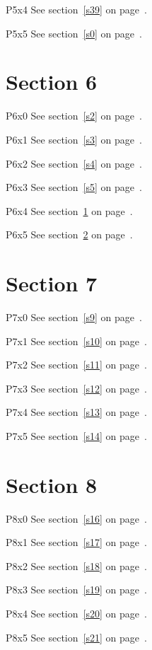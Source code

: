 P5x4 \w\w\w\w\w\w See section~\ref{s39} on page~\pageref{s19}.

P5x5 \w\w\w\w\w\w See section~\ref{s0} on page~\pageref{s20}.

\section{Section 6}\label{s6}
P6x0 \w\w\w\w\w\w See section~\ref{s2} on page~\pageref{s18}.

P6x1 \w\w\w\w\w\w See section~\ref{s3} on page~\pageref{s19}.

P6x2 \w\w\w\w\w\w See section~\ref{s4} on page~\pageref{s20}.

P6x3 \w\w\w\w\w\w See section~\ref{s5} on page~\pageref{s21}.

P6x4 \w\w\w\w\w\w See section~\ref{s6} on page~\pageref{s22}.

P6x5 \w\w\w\w\w\w See section~\ref{s7} on page~\pageref{s23}.

\section{Section 7}\label{s7}
P7x0 \w\w\w\w\w\w See section~\ref{s9} on page~\pageref{s21}.

P7x1 \w\w\w\w\w\w See section~\ref{s10} on page~\pageref{s22}.

P7x2 \w\w\w\w\w\w See section~\ref{s11} on page~\pageref{s23}.

P7x3 \w\w\w\w\w\w See section~\ref{s12} on page~\pageref{s24}.

P7x4 \w\w\w\w\w\w See section~\ref{s13} on page~\pageref{s25}.

P7x5 \w\w\w\w\w\w See section~\ref{s14} on page~\pageref{s26}.

\section{Section 8}\label{s8}
P8x0 \w\w\w\w\w\w See section~\ref{s16} on page~\pageref{s24}.

P8x1 \w\w\w\w\w\w See section~\ref{s17} on page~\pageref{s25}.

P8x2 \w\w\w\w\w\w See section~\ref{s18} on page~\pageref{s26}.

P8x3 \w\w\w\w\w\w See section~\ref{s19} on page~\pageref{s27}.

P8x4 \w\w\w\w\w\w See section~\ref{s20} on page~\pageref{s28}.

P8x5 \w\w\w\w\w\w See section~\ref{s21} on page~\pageref{s29}.

